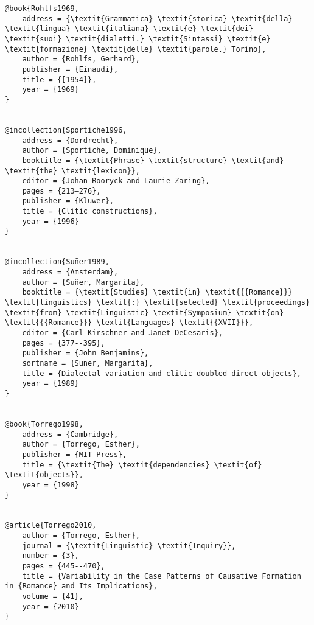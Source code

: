 \documentclass[output=paper]{langscibook}
\begin{document}
\begin{verbatim}
@book{Rohlfs1969,
	address = {\textit{Grammatica} \textit{storica} \textit{della} \textit{lingua} \textit{italiana} \textit{e} \textit{dei} \textit{suoi} \textit{dialetti.} \textit{Sintassi} \textit{e} \textit{formazione} \textit{delle} \textit{parole.} Torino},
	author = {Rohlfs, Gerhard},
	publisher = {Einaudi},
	title = {[1954]},
	year = {1969}
}


@incollection{Sportiche1996,
	address = {Dordrecht},
	author = {Sportiche, Dominique},
	booktitle = {\textit{Phrase} \textit{structure} \textit{and} \textit{the} \textit{lexicon}},
	editor = {Johan Rooryck and Laurie Zaring},
	pages = {213–276},
	publisher = {Kluwer},
	title = {Clitic constructions},
	year = {1996}
}


@incollection{Suñer1989,
	address = {Amsterdam},
	author = {Suñer, Margarita},
	booktitle = {\textit{Studies} \textit{in} \textit{{{Romance}}} \textit{linguistics} \textit{:} \textit{selected} \textit{proceedings} \textit{from} \textit{Linguistic} \textit{Symposium} \textit{on} \textit{{{Romance}}} \textit{Languages} \textit{{XVII}}},
	editor = {Carl Kirschner and Janet DeCesaris},
	pages = {377--395},
	publisher = {John Benjamins},
	sortname = {Suner, Margarita},
	title = {Dialectal variation and clitic-doubled direct objects},
	year = {1989}
}


@book{Torrego1998,
	address = {Cambridge},
	author = {Torrego, Esther},
	publisher = {MIT Press},
	title = {\textit{The} \textit{dependencies} \textit{of} \textit{objects}},
	year = {1998}
}


@article{Torrego2010,
	author = {Torrego, Esther},
	journal = {\textit{Linguistic} \textit{Inquiry}},
	number = {3},
	pages = {445--470},
	title = {Variability in the Case Patterns of Causative Formation in {Romance} and Its Implications},
	volume = {41},
	year = {2010}
}


\end{verbatim} 

\sloppy
\printbibliography[heading=subbibliography,notkeyword=this] 
\end{document}
